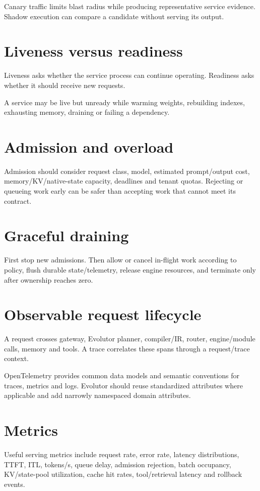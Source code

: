 Canary traffic limits blast radius while producing representative service evidence. Shadow execution can compare a candidate without serving its output.

\section{Liveness versus readiness}
Liveness asks whether the service process can continue operating. Readiness asks whether it should receive new requests.

A service may be live but unready while warming weights, rebuilding indexes, exhausting memory, draining or failing a dependency.

\section{Admission and overload}
Admission should consider request class, model, estimated prompt/output cost, memory/KV/native-state capacity, deadlines and tenant quotas. Rejecting or queueing work early can be safer than accepting work that cannot meet its contract.

\section{Graceful draining}
First stop new admissions. Then allow or cancel in-flight work according to policy, flush durable state/telemetry, release engine resources, and terminate only after ownership reaches zero.

\section{Observable request lifecycle}
A request crosses gateway, Evolutor planner, compiler/IR, router, engine/module calls, memory and tools. A trace correlates these spans through a request/trace context.

OpenTelemetry provides common data models and semantic conventions for traces, metrics and logs. Evolutor should reuse standardized attributes where applicable and add narrowly namespaced domain attributes.

\section{Metrics}
Useful serving metrics include request rate, error rate, latency distributions, TTFT, ITL, tokens/s, queue delay, admission rejection, batch occupancy, KV/state-pool utilization, cache hit rates, tool/retrieval latency and rollback events.

